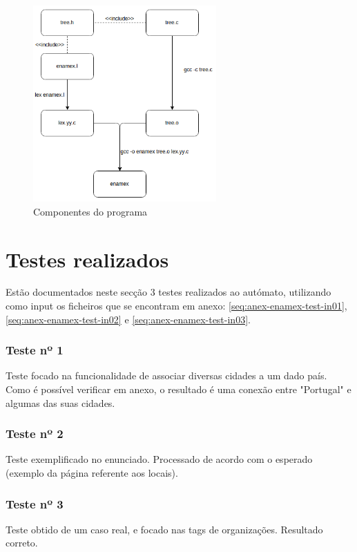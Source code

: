 \begin{figure}[H]
\centering
\includegraphics[width=7cm]{anexos/2-2/programa.png}
\caption{Componentes do programa}
\end{figure}
\section{Testes realizados}
\label{seq:enamex-test}
Estão documentados neste secção 3 testes realizados ao autómato, utilizando como input os ficheiros que se encontram em anexo: \ref{seq:anex-enamex-test-in01}, \ref{seq:anex-enamex-test-in02} e \ref{seq:anex-enamex-test-in03}.

\subsubsection{Teste nº 1}

Teste focado na funcionalidade de associar diversas cidades a um dado país. Como é possível verificar em anexo, o resultado é uma conexão entre "Portugal" e algumas das suas cidades.

\subsubsection{Teste nº 2}

Teste exemplificado no enunciado. Processado de acordo com o esperado (exemplo da página referente aos locais).

\subsubsection{Teste nº 3}

Teste obtido de um caso real, e focado nas tags de organizações. Resultado correto.



